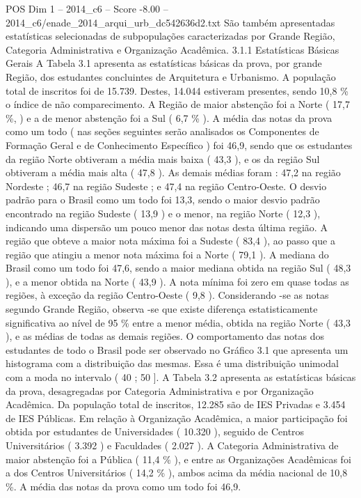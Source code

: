 \begin{textsample}{POS Dim 1 – 2014\_c6 – Score -8.00 – 2014\_c6/enade\_2014\_arqui\_urb\_dc542636d2.txt}
São também apresentadas estatísticas selecionadas de subpopulações caracterizadas por Grande Região, Categoria Administrativa e Organização Acadêmica. 3.1.1 Estatísticas Básicas Gerais A Tabela 3.1 apresenta as estatísticas básicas da prova, por grande Região, dos estudantes concluintes de Arquitetura e Urbanismo.
A população total de inscritos foi de 15.739.
Destes, 14.044 estiveram presentes, sendo 10,8 \% o índice de não comparecimento.
A Região de maior abstenção foi a Norte ( 17,7 \%, ) e a de menor abstenção foi a Sul ( 6,7 \% ).
A média das notas da prova como um todo ( nas seções seguintes serão analisados os Componentes de Formação Geral e de Conhecimento Específico ) foi 46,9, sendo que os estudantes da região Norte obtiveram a média mais baixa ( 43,3 ), e os da região Sul obtiveram a média mais alta ( 47,8 ).
As demais médias foram : 47,2 na região Nordeste ; 46,7 na região Sudeste ; e 47,4 na região Centro-Oeste.
O desvio padrão para o Brasil como um todo foi 13,3, sendo o maior desvio padrão encontrado na região Sudeste ( 13,9 ) e o menor, na região Norte ( 12,3 ), indicando uma dispersão um pouco menor das notas desta última região.
A região que obteve a maior nota máxima foi a Sudeste ( 83,4 ), ao passo que a região que atingiu a menor nota máxima foi a Norte ( 79,1 ).
A mediana do Brasil como um todo foi 47,6, sendo a maior mediana obtida na região Sul ( 48,3 ), e a menor obtida na Norte ( 43,9 ).
A nota mínima foi zero em quase todas as regiões, à exceção da região Centro-Oeste ( 9,8 ).
Considerando -se as notas segundo Grande Região, observa -se que existe diferença estatisticamente significativa ao nível de 95 \% entre a menor média, obtida na região Norte ( 43,3 ), e as médias de todas as demais regiões.
O comportamento das notas dos estudantes de todo o Brasil pode ser observado no Gráfico 3.1 que apresenta um histograma com a distribuição das mesmas.
Essa é uma distribuição unimodal com a moda no intervalo ( 40 ; 50 ].
A Tabela 3.2 apresenta as estatísticas básicas da prova, desagregadas por Categoria Administrativa e por Organização Acadêmica.
Da população total de inscritos, 12.285 são de IES Privadas e 3.454 de IES Públicas.
Em relação à Organização Acadêmica, a maior participação foi obtida por estudantes de Universidades ( 10.320 ), seguido de Centros Universitários ( 3.392 ) e Faculdades ( 2.027 ).
A Categoria Administrativa de maior abstenção foi a Pública ( 11,4 \% ), e entre as Organizações Acadêmicas foi a dos Centros Universitários ( 14,2 \% ), ambos acima da média nacional de 10,8 \%.
A média das notas da prova como um todo foi 46,9.

\end{textsample}
